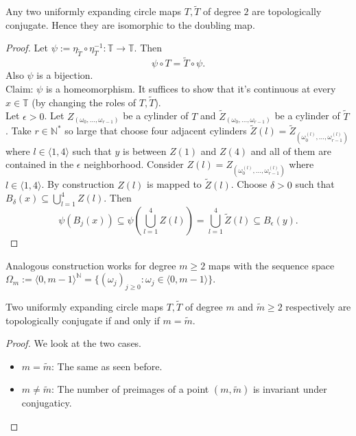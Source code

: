 \documentclass{article}
\newcommand*{\N}{\mathbb{N}}
\newcommand*{\T}{\mathbb{T}}
\newcommand*{\Ns}{\N^*}
\newcommand*{\jbr}[1]{{\langle #1 \rangle}}
\begin{document}
\begin{thm}
    Any two uniformly expanding circle maps $T, \tilde T$ of degree $2$ are topologically conjugate. Hence they are isomorphic to the doubling map.
\end{thm}

\begin{proof}
    Let $\psi:= \eta_{\tilde T}\circ\eta_T^{-1}:\T\to\T$. Then
    $$\psi\circ T=\tilde T\circ \psi.$$
    Also $\psi$ is a bijection. \\
    Claim: $\psi$ is a homeomorphism. It suffices to show that it's continuous at every $x\in\T$ (by changing the roles of $T, \tilde T$).\\
    Let $\epsilon > 0$. Let $Z_{(\omega_0,\dots,\omega_{r-1})}$ be a cylinder of $T$ and $\tilde Z_{(\omega_0,\dots,\omega_{r-1})}$ be a cylinder of $\tilde T$. Take $r\in\Ns$ so large that choose four adjacent cylinders $\tilde Z(l) = \tilde Z_{(\omega_0^{(l)},\dots,\omega_{r-1}^{(l)})}$ where $l\in\jbr{1,4}$ such that $y$ is between $Z(1)$ and $Z(4)$ and all of them are contained in the $\epsilon$ neighborhood. Consider $Z(l) = Z_{(\omega_0^{(l)},\dots,\omega_{r-1}^{(l)})}$ where $l\in\jbr{1,4}$. By construction $Z(l)$ is mapped to $\tilde Z(l)$. Choose $\delta > 0$ such that $B_\delta(x)\subseteq \bigcup_{l=1}^4Z(l)$. Then
    $$\psi(B_j(x))\subseteq \psi\left(\bigcup_{l=1}^4Z(l)\right)=\bigcup_{l=1}^4\tilde Z(l)\subseteq B_\epsilon(y).$$
\end{proof}

\begin{rem}
    Analogous construction works for degree $m\geq 2$ maps with the sequence space $\Omega_m:=\jbr{0,m-1}^\N=\{(\omega_j)_{j\geq0}:\omega_j\in\jbr{0,m-1}\}$.
\end{rem}

\begin{thm}
    Two uniformly expanding circle maps $T, \tilde T$ of degree $m$ and $\tilde m\geq 2$ respectively are topologically conjugate if and only if $m=\tilde m$.
\end{thm}

\begin{proof}
    We look at the two cases.
    \begin{itemize}
        \item $m=\tilde m$: The same as seen before.

        \item $m\neq \tilde m$: The number of preimages of a point $(m,\tilde m)$ is invariant under conjugaticy.
    \end{itemize}
\end{proof}
\end{document}
